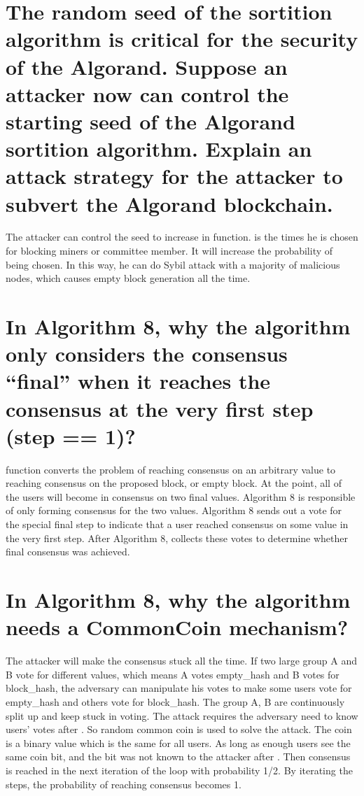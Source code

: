 \documentclass{article}
\begin{document}
\section{The random seed of the sortition algorithm is critical for the security of the
Algorand. Suppose an attacker now can control the starting seed of the Algorand
sortition algorithm. Explain an attack strategy for the attacker to subvert the
Algorand blockchain.}
The attacker can control the seed to increase  in  function.
 is the times he is chosen for blocking miners or committee member.
It will increase the probability of being chosen.
In this way, he can do Sybil attack with a majority of malicious nodes, which causes
empty block generation all the time.
\section{In Algorithm 8, why the algorithm only considers the consensus “final” when it
reaches the consensus at the very first step (step == 1)?}
 function converts
the problem of reaching consensus on an arbitrary value
to reaching consensus on the proposed block, or empty block. 
At the point, all of the users will become in consensus on two final values.
Algorithm 8 is responsible of only forming consensus for the two values.
Algorithm 8 sends out a vote for the special
final step to indicate that a user reached consensus on some
value in the very first step. After Algorithm 8,  collects these votes
to determine whether final consensus was achieved.
\section{In Algorithm 8, why the algorithm needs a CommonCoin mechanism? }
The attacker will make the consensus stuck all the time. If two large group A and B vote for different values, which means A votes empty\_hash and B votes for block\_hash, 
the adversary can manipulate his votes to make some users vote for empty\_hash 
and others vote for block\_hash. 
The group A, B are continuously split up and keep stuck in voting.
The attack requires the adversary need to know users' votes after .
So random common coin is used to solve the attack.
The coin is a binary value which is the same for all users.
As long as
enough users see the same coin bit, and the bit was not
known to the attacker after .
Then consensus is reached in the next iteration of the loop with
probability 1/2.
By iterating the steps, the probability of reaching consensus becomes 1.
\end{document}
